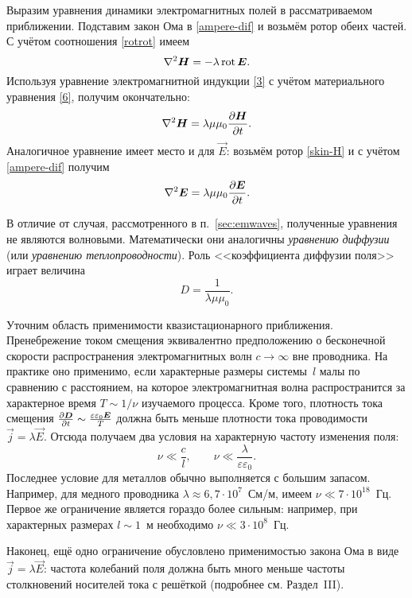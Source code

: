 Выразим уравнения динамики электромагнитных полей в рассматриваемом приближении.
Подставим закон Ома в \eqref{ampere-dif} и возьмём ротор обеих частей.
С учётом соотношения \eqref{rotrot} имеем
\begin{equation*} \eqmark{8}
\nabla^2\vec{H}= -\lambda \Rot \vec{E}.
\end{equation*}
Используя уравнение электромагнитной индукции \eqref{3} с учётом материального 
уравнения \eqref{6}, получим окончательно:
\begin{equation}\eqmark{skin-H}
\nabla^2\vec{H}= \lambda\mu\mu_0 \ddt{\vec{H}}.
\end{equation}
Аналогичное уравнение имеет место и для $\vec{E}$:
возьмём ротор \eqref{skin-H} и с учётом \eqref{ampere-dif} получим
\begin{equation}\eqmark{skin-E}
\nabla^2\vec{E}= \lambda\mu\mu_0 \ddt{\vec{E}}.
\end{equation}

В отличие от случая, рассмотренного в п.~\ref{sec:emwaves}, 
полученные уравнения не являются волновыми. Математически они аналогичны
\emph{уравнению диффузии} (или \emph{уравнению теплопроводности}). Роль 
<<коэффициента диффузии поля>> играет величина
\begin{equation}
D = \frac{1}{\lambda \mu \mu_0}.
\end{equation}

\begin{lab:note}
    Уточним область применимости квазистационарного приближения.
    Пренебрежение током смещения эквивалентно предположению о бесконечной скорости 
    распространения электромагнитных волн $c\to \infty$ вне проводника. 
    На практике оно применимо, если характерные размеры системы~$l$ малы по
    сравнению с расстоянием, на которое электромагнитная волна распространится
    за характерное время $T\sim 1/\nu$ изучаемого процесса.
    Кроме того, плотность тока смещения 
    $\frac{\partial {\boldsymbol{D}}}{\partial t} \sim \frac{\varepsilon\varepsilon_0 {\boldsymbol{E}}}{T}$ 
    должна быть меньше плотности тока проводимости $\vec{j}=\lambda\vec{E}$.
    Отсюда получаем два условия на характерную частоту изменения поля:
    \[
    \nu \ll \frac{c}{l},\qquad \nu \ll \frac{\lambda}{\varepsilon\varepsilon_0}.
    \]
    Последнее условие для металлов обычно выполняется с большим запасом. 
    Например, для медного проводника $\lambda \approx 6,7\cdot 10^7$~См/м,
    имеем $\nu \ll 7\cdot 10^{18}$~Гц. Первое же ограничение является гораздо 
    более сильным: например, при характерных размерах $l\sim 1$~м необходимо
    $\nu \ll 3 \cdot 10^8$~Гц.
    
    Наконец, ещё одно ограничение обусловлено применимостью закона Ома в виде
    $\vec{j}=\lambda \vec{E}$: частота колебаний поля должна быть много меньше 
    частоты столкновений носителей тока с решёткой
    (подробнее см. Раздел~III).
\end{lab:note}


